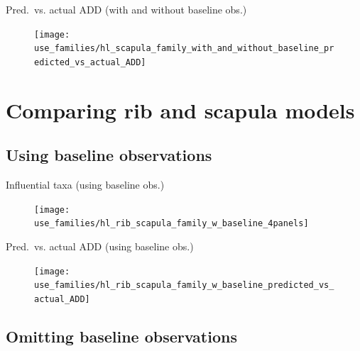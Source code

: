 \documentclass{beamer}
\begin{document}
\begin{frame}{Pred.\ vs. actual ADD (with and without baseline obs.)}

  \begin{center}
    \begin{figure}
      \texttt{[image: use\_families/hl\_scapula\_family\_with\_and\_without\_baseline\_predicted\_vs\_actual\_ADD]}
    \end{figure}
  \end{center}
  \vspace{-0.1in}

\end{frame}



\section[Ribs and scapulae]{Comparing rib and scapula models}

\subsection[With baseline]{Using baseline observations}

\begin{frame}{Influential taxa (using baseline obs.)}

  \begin{center}
    \begin{figure}
      \texttt{[image: use\_families/hl\_rib\_scapula\_family\_w\_baseline\_4panels]}
    \end{figure}
  \end{center}
  
\end{frame}


\begin{frame}{Pred.\ vs. actual ADD (using baseline obs.)}

  \begin{center}
    \begin{figure}
      \texttt{[image: use\_families/hl\_rib\_scapula\_family\_w\_baseline\_predicted\_vs\_actual\_ADD]}
    \end{figure}
  \end{center}
\end{frame}


\subsection[No baseline]{Omitting baseline observations}
\end{document}
